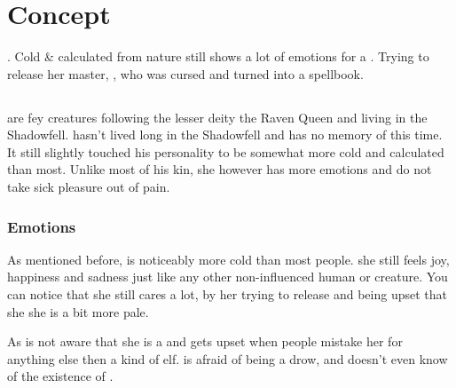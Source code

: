 \ifdm
    \chapter{Concept}
    \label{concept}

     \Race{}. Cold \& calculated from nature \Name{} still shows a lot of emotions for a \Race. Trying to release her master, \MasterFullName{}, who was cursed and turned into a spellbook.

    \section{\Race{}} 
    \Race{} are fey creatures following the lesser deity the Raven Queen and living in the Shadowfell. \Name{} hasn't lived long in the Shadowfell and has no memory of this time. It still slightly touched his personality to be somewhat more cold and calculated than most. Unlike most of his kin, she however has more emotions and do not take sick pleasure out of pain.

    \subsection{Emotions}
    As mentioned before, \Name{} is noticeably more cold than most people. she still feels joy, happiness and sadness just like any other non-influenced human or creature. You can notice that she still cares a lot, by her trying to release \Master{} and being upset that she she is a bit more pale.

    As \Name{} is not aware that she is a \Race{} and gets upset when people mistake her for anything else then a kind of elf. \Name{} is afraid of being a drow, and doesn't even know of the existence of \Race{}.


